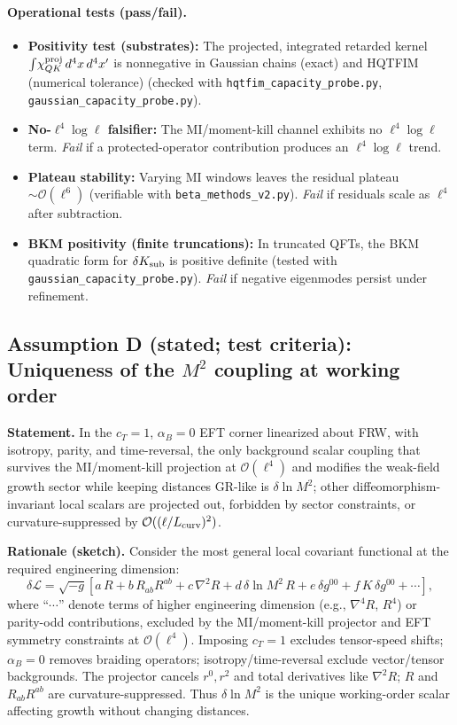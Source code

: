 \documentclass[aps,prd,onecolumn,superscriptaddress,nofootinbib]{revtex4-2}
\def\alpha{alpha}%
\def\alpha_M{alphaM}%
\providecommand{\be}{\begin{equation}}
\providecommand{\ee}{\end{equation}}
\begin{document}
\paragraph{Operational tests (pass/fail).}
\begin{itemize}[leftmargin=*,noitemsep,topsep=0pt]
\item \textbf{Positivity test (substrates):} The projected, integrated retarded kernel \(\int\!\chi^{\rm proj}_{QK}\,d^4x\,d^4x'\) is nonnegative in Gaussian chains (exact) and HQTFIM (numerical tolerance) (checked with \texttt{hqtfim\_capacity\_probe.py}, \texttt{gaussian\_capacity\_probe.py}).
\item \textbf{No-\(\ell^4\log\ell\) falsifier:} The MI/moment-kill channel exhibits no \(\ell^4\log\ell\) term. \emph{Fail} if a protected-operator contribution produces an \(\ell^4\log\ell\) trend.
\item \textbf{Plateau stability:} Varying MI windows leaves the residual plateau \(\sim\mathcal O(\ell^6)\) (verifiable with \texttt{beta\_methods\_v2.py}). \emph{Fail} if residuals scale as \(\ell^4\) after subtraction.
\item \textbf{BKM positivity (finite truncations):} In truncated QFTs, the BKM quadratic form for \(\delta K_{\rm sub}\) is positive definite (tested with \texttt{gaussian\_capacity\_probe.py}). \emph{Fail} if negative eigenmodes persist under refinement.
\end{itemize}

\subsection{Assumption D (stated; test criteria): Uniqueness of the \texorpdfstring{$M^2$}{M^2} coupling at working order}
\label{sec:lemmaD}

\noindent\textbf{Statement.} In the \(c_T\!=\!1\), \(\alpha_B\!=\!0\) EFT corner linearized about FRW, with isotropy, parity, and time-reversal, the only background scalar coupling that survives the MI/moment-kill projection at \(\mathcal O(\ell^4)\) and modifies the weak-field growth sector while keeping distances GR-like is \(\delta\ln M^2\); other diffeomorphism-invariant local scalars are projected out, forbidden by sector constraints, or curvature-suppressed by \(\mathcal O((\ell/L_{\rm curv})^2)\).

\smallskip
\noindent\textbf{Rationale (sketch).} Consider the most general local covariant functional at the required engineering dimension:
\be
\delta\mathcal L=\sqrt{-g}\left[a\,R+b\,R_{ab}R^{ab}+c\,\nabla^2 R+d\,\delta\ln M^2\,R
+ e\,\delta g^{00}+ f\,K\,\delta g^{00}+ \cdots\right],
\ee
\noindent where ``\(\cdots\)'' denote terms of higher engineering dimension (e.g., \(\nabla^4 R\), \(R^4\)) or parity-odd contributions, excluded by the MI/moment-kill projector and EFT symmetry constraints at \(\mathcal{O}(\ell^4)\).
Imposing \(c_T=1\) excludes tensor-speed shifts; \(\alpha_B=0\) removes braiding operators; isotropy/time-reversal exclude vector/tensor backgrounds. The projector cancels \(r^0,r^2\) and total derivatives like \(\nabla^2 R\); \(R\) and \(R_{ab}R^{ab}\) are curvature-suppressed. Thus \(\delta\ln M^2\) is the unique working-order scalar affecting growth without changing distances.
\end{document}

